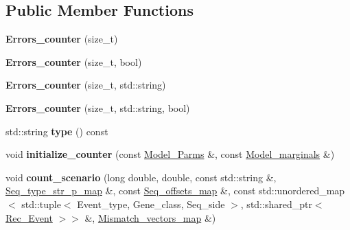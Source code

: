 \subsection*{Public Member Functions}
\begin{DoxyCompactItemize}
\item 
\mbox{\label{classErrors__counter_af81869dca1c7eb7f48eef6dc8136517b}} 
{\bfseries Errors\+\_\+counter} (size\+\_\+t)
\item 
\mbox{\label{classErrors__counter_ab493a9d65b00847775341f7e30419488}} 
{\bfseries Errors\+\_\+counter} (size\+\_\+t, bool)
\item 
\mbox{\label{classErrors__counter_aae46dd0bba1958343e486750d2e973a9}} 
{\bfseries Errors\+\_\+counter} (size\+\_\+t, std\+::string)
\item 
\mbox{\label{classErrors__counter_a8f570677df85809d45610899941b6f01}} 
{\bfseries Errors\+\_\+counter} (size\+\_\+t, std\+::string, bool)
\item 
\mbox{\label{classErrors__counter_a76c7bd69579763b36b3f110fcfcc53c2}} 
std\+::string {\bfseries type} () const
\item 
\mbox{\label{classErrors__counter_afebd470d99db9d51f737b30f12395052}} 
void {\bfseries initialize\+\_\+counter} (const \hyperlink{classModel__Parms}{Model\+\_\+\+Parms} \&, const \hyperlink{classModel__marginals}{Model\+\_\+marginals} \&)
\item 
\mbox{\label{classErrors__counter_aa1a3ac389f93b7498b92ec72d1eb9538}} 
void {\bfseries count\+\_\+scenario} (long double, double, const std\+::string \&, \hyperlink{classEnum__fast__memory__map}{Seq\+\_\+type\+\_\+str\+\_\+p\+\_\+map} \&, const \hyperlink{classEnum__fast__memory__dual__key__map}{Seq\+\_\+offsets\+\_\+map} \&, const std\+::unordered\+\_\+map$<$ std\+::tuple$<$ Event\+\_\+type, Gene\+\_\+class, Seq\+\_\+side $>$, std\+::shared\+\_\+ptr$<$ \hyperlink{classRec__Event}{Rec\+\_\+\+Event} $>$$>$ \&, \hyperlink{classEnum__fast__memory__map}{Mismatch\+\_\+vectors\+\_\+map} \&)
\item 
\mbox{\label{classErrors__counter_a2ef5445a5ad019983d47639b11a72f4f}} 
$$
\end{DoxyCompactItemize}
